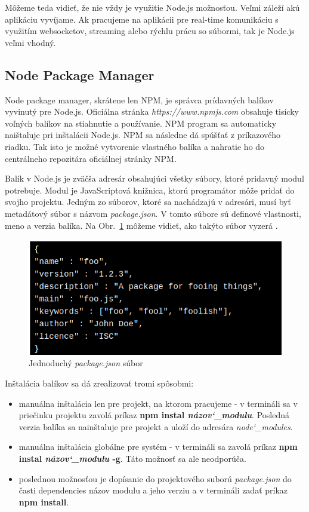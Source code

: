 \indent Môžeme teda vidieť, že nie vždy je využitie Node.js možnosťou. Veľmi záleží akú aplikáciu vyvíjame. Ak pracujeme na aplikácii pre real-time komunikáciu s využitím websocketov, streaming alebo rýchlu prácu so súbormi, tak je Node.js veľmi vhodný. 

\subsection{Node Package Manager}
\indent Node package manager, skrátene len NPM, je správca prídavných balíkov vyvinutý pre Node.js. Oficiálna stránka \textit{https://www.npmjs.com} obsahuje tisícky voľných balíkov na stiahnutie a používanie. NPM program sa automaticky naištaluje pri inštalácii Node.js. NPM sa následne dá spúšťať z príkazového riadku. Tak isto je možné vytvorenie vlastného balíka a nahratie ho do centrálneho repozitára oficiálnej stránky NPM.

\indent Balík v Node.js je zväčša adresár obsahujúci všetky súbory, ktoré pridavný modul potrebuje. Modul je JavaScriptová knižnica, ktorú programátor môže pridať do svojho projektu. Jedným zo súborov, ktoré sa nachádzajú v adresári, musí byť metadátový súbor s názvom \textit{package.json}. V tomto súbore sú definové vlastnosti, meno a verzia balíka. Na Obr.~\ref{fig:package} môžeme vidieť, ako takýto súbor vyzerá \cite{npm,npm_node}.  

\begin{figure}[H]
    \centering
    \includegraphics[scale=0.55]{img/package.png}
    \caption{Jednoduchý \textit{package.json} súbor \cite{npm}}
    \label{fig:package}
\end{figure}

Inštalácia balíkov sa dá zrealizovať tromi spôsobmi:
\begin{itemize}
    \item manuálna inštalácia len pre projekt, na ktorom pracujeme - v termináli sa v priečinku projektu zavolá príkaz \textbf{npm instal \textit{názov\char`_modulu}}. Posledná verzia balíka sa nainštaluje pre projekt a uloží do adresára \textit{node\char`_modules}.
    \item manuálna inštalácia globálne pre systém - v termináli sa zavolá príkaz \textbf{npm instal \textit{názov\char`_modulu} -g}. Táto možnosť sa ale neodporúča.
    \item poslednou možnosťou je dopísanie do projektového suború \textit{package.json} do časti dependencies názov modulu a jeho verziu a v termináli zadať príkaz \textbf{npm install}.
\end{itemize}

